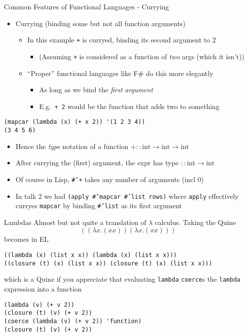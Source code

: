 \documentclass[presentation]{beamer}
\begin{document}
\begin{frame}[fragile]{Common Features of Functional Languages - Currying}
\begin{itemize}
\item Currying (binding some but not all function arguments)
\begin{itemize}
\item In this example \texttt{+} is curryed, binding its second argument to 2
\begin{itemize}
\item (Assuming \texttt{+} is considered as a function of \emph{two} args (which it isn't))
\end{itemize}
\item ``Proper'' functional languages like F\# do this more elegantly
\begin{itemize}
\item As long as we bind the \emph{first argument}
\item E.g.\ \texttt{+ 2} would be the function that adds two to something
\end{itemize}
\end{itemize}
\end{itemize}

\begin{verbatim}
(mapcar (lambda (x) (+ x 2)) '(1 2 3 4))
(3 4 5 6)
\end{verbatim}

\begin{itemize}
\item Hence the \emph{type} notation of a function \(+::\mathrm{int}\rightarrow\mathrm{int}\rightarrow\mathrm{int}\)
\item After currying the (first) argument, the expr has type \(::\mathrm{int}\rightarrow\mathrm{int}\)
\item Of course in Lisp, \texttt{\#'+} takes any number of arguments (incl 0)
\item In talk 2 we had \texttt{(apply \#'mapcar \#'list rows)} where \texttt{apply} effectively curryes \texttt{mapcar} by binding \texttt{\#'list} as its first argument
\end{itemize}
\end{frame}

\begin{frame}[fragile]{Lambdas}
  Almost but not quite a translation of $\lambda$ calculus.  Taking the Quine
  \begin{equation*}
    ((\lambda x. (x x)) (\lambda x. (x x)))
  \end{equation*}
  becomes in EL
\begin{verbatim}
((lambda (x) (list x x)) (lambda (x) (list x x)))
((closure (t) (x) (list x x)) (closure (t) (x) (list x x)))
\end{verbatim}
which is a Quine if you appreciate that evaluating \texttt{lambda} \texttt{coerce}s the \texttt{lambda} expression into a function
\begin{verbatim}
(lambda (v) (+ v 2))
(closure (t) (v) (+ v 2))
(coerce (lambda (v) (+ v 2)) 'function)
(closure (t) (v) (+ v 2))
\end{verbatim}
\end{frame}
\end{document}
